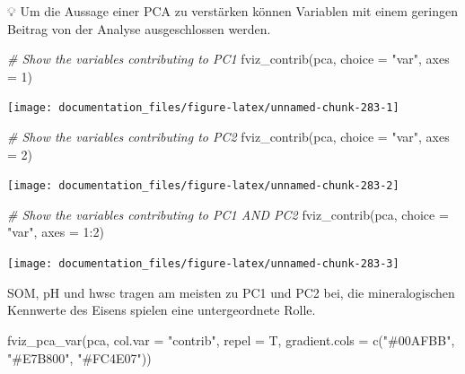 \documentclass[
]{article}
\newenvironment{Shaded}{\begin{snugshade}}{\end{snugshade}}
\newcommand{\AttributeTok}[1]{\textcolor[rgb]{0.77,0.63,0.00}{#1}}
\newcommand{\CommentTok}[1]{\textcolor[rgb]{0.56,0.35,0.01}{\textit{#1}}}
\newcommand{\DecValTok}[1]{\textcolor[rgb]{0.00,0.00,0.81}{#1}}
\newcommand{\FunctionTok}[1]{\textcolor[rgb]{0.00,0.00,0.00}{#1}}
\newcommand{\NormalTok}[1]{#1}
\newcommand{\SpecialCharTok}[1]{\textcolor[rgb]{0.00,0.00,0.00}{#1}}
\newcommand{\StringTok}[1]{\textcolor[rgb]{0.31,0.60,0.02}{#1}}
\begin{document}
💡 Um die Aussage einer PCA zu verstärken können Variablen mit einem geringen Beitrag von der Analyse ausgeschlossen werden.

\begin{Shaded}
\begin{Highlighting}[]
\CommentTok{\# Show the variables contributing to PC1}
\FunctionTok{fviz\_contrib}\NormalTok{(pca, }\AttributeTok{choice =} \StringTok{"var"}\NormalTok{, }\AttributeTok{axes =} \DecValTok{1}\NormalTok{)}
\end{Highlighting}
\end{Shaded}

\begin{center}\texttt{[image: documentation\_files/figure-latex/unnamed-chunk-283-1]} \end{center}

\begin{Shaded}
\begin{Highlighting}[]

\CommentTok{\# Show the variables contributing to PC2}
\FunctionTok{fviz\_contrib}\NormalTok{(pca, }\AttributeTok{choice =} \StringTok{"var"}\NormalTok{, }\AttributeTok{axes =} \DecValTok{2}\NormalTok{)}
\end{Highlighting}
\end{Shaded}

\begin{center}\texttt{[image: documentation\_files/figure-latex/unnamed-chunk-283-2]} \end{center}

\begin{Shaded}
\begin{Highlighting}[]

\CommentTok{\# Show the variables contributing to PC1 AND PC2}
\FunctionTok{fviz\_contrib}\NormalTok{(pca, }\AttributeTok{choice =} \StringTok{"var"}\NormalTok{, }\AttributeTok{axes =} \DecValTok{1}\SpecialCharTok{:}\DecValTok{2}\NormalTok{)}
\end{Highlighting}
\end{Shaded}

\begin{center}\texttt{[image: documentation\_files/figure-latex/unnamed-chunk-283-3]} \end{center}

SOM, pH und hwsc tragen am meisten zu PC1 und PC2 bei, die mineralogischen Kennwerte des Eisens spielen eine untergeordnete Rolle.

\begin{Shaded}
\begin{Highlighting}[]

\FunctionTok{fviz\_pca\_var}\NormalTok{(pca, }\AttributeTok{col.var =} \StringTok{"contrib"}\NormalTok{, }\AttributeTok{repel =}\NormalTok{ T, }\AttributeTok{gradient.cols =} \FunctionTok{c}\NormalTok{(}\StringTok{"\#00AFBB"}\NormalTok{, }\StringTok{"\#E7B800"}\NormalTok{, }\StringTok{"\#FC4E07"}\NormalTok{))}
\end{Highlighting}
\end{Shaded}
\end{document}

